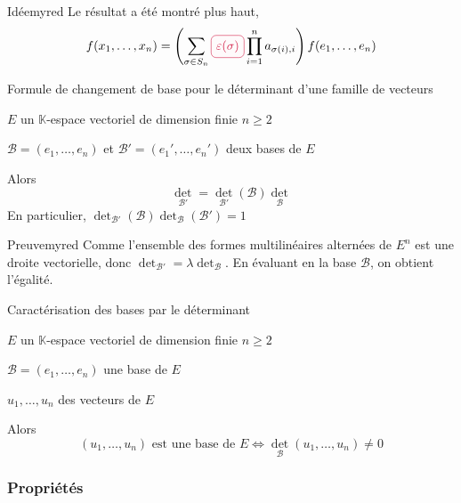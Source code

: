     \begin{demo}{Idée}{myred}
        Le résultat a été montré plus haut, 
        \[ f(x_1,\ldots,x_n) = \left(\sum_{\sigma \in S_n} \lilbox{myred}{$\varepsilon(\sigma)$} \prod_{i = 1}^n a_{\sigma(i),i}\right) f(e_1,\ldots,e_n) \]
    \end{demo}

    \begin{prop}{Formule de changement de base pour le déterminant d’une famille de vecteurs}{}
        \begin{soient}
            \item $E$ un $\mathbb{K}$-espace vectoriel de dimension finie $n \geq 2$
            \item $\mathcal{B} = (e_1,\ldots,e_n)$ et $\mathcal{B}' = (e_1',\ldots,e_n')$ deux bases de $E$
        \end{soient}

        Alors \[ \det_{\mathcal{B}'} = \det_{\mathcal{B}'}(\mathcal{B})\det_{\mathcal{B}} \]
        En particulier, $\det_{\mathcal{B}'}(\mathcal{B}) \det_{\mathcal{B}}(\mathcal{B}') = 1$
    \end{prop}

    \begin{demo}{Preuve}{myred}
        Comme l’ensemble des formes multilinéaires alternées de $E^n$ est une droite vectorielle, donc $\det_{\mathcal{B}'} = \lambda \det_{\mathcal{B}}$. En évaluant en la base $\mathcal{B}$, on obtient l’égalité.
    \end{demo}

    \begin{coro}{Caractérisation des bases par le déterminant}{}
        \begin{soient}
            \item $E$ un $\mathbb{K}$-espace vectoriel de dimension finie $n \geq 2$
            \item $\mathcal{B} = (e_1,\ldots,e_n)$ une base de $E$
            \item $u_1, \ldots,u_n$ des vecteurs de $E$
        \end{soient}

        Alors \[ (u_1,\ldots,u_n) \text{ est une base de } E \iff \det_{\mathcal{B}}(u_1,\ldots,u_n) \neq 0 \]
    \end{coro}

    \subsubsection{Propriétés}


